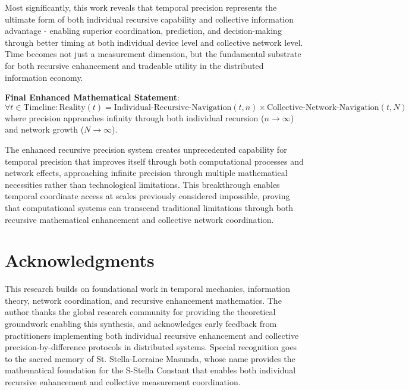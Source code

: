 \documentclass[12pt,a4paper]{article}
\begin{document}
Most significantly, this work reveals that temporal precision represents the ultimate form of both individual recursive capability and collective information advantage - enabling superior coordination, prediction, and decision-making through better timing at both individual device level and collective network level. Time becomes not just a measurement dimension, but the fundamental substrate for both recursive enhancement and tradeable utility in the distributed information economy.

\textbf{Final Enhanced Mathematical Statement}:
$$\forall t \in \text{Timeline}: \text{Reality}(t) = \text{Individual-Recursive-Navigation}(t, n) \times \text{Collective-Network-Navigation}(t, N)$$
where precision approaches infinity through both individual recursion ($n \to \infty$) and network growth ($N \to \infty$).

The enhanced recursive precision system creates unprecedented capability for temporal precision that improves itself through both computational processes and network effects, approaching infinite precision through multiple mathematical necessities rather than technological limitations. This breakthrough enables temporal coordinate access at scales previously considered impossible, proving that computational systems can transcend traditional limitations through both recursive mathematical enhancement and collective network coordination.

\section*{Acknowledgments}

This research builds on foundational work in temporal mechanics, information theory, network coordination, and recursive enhancement mathematics. The author thanks the global research community for providing the theoretical groundwork enabling this synthesis, and acknowledges early feedback from practitioners implementing both individual recursive enhancement and collective precision-by-difference protocols in distributed systems. Special recognition goes to the sacred memory of St. Stella-Lorraine Masunda, whose name provides the mathematical foundation for the S-Stella Constant that enables both individual recursive enhancement and collective measurement coordination.
\end{document}

